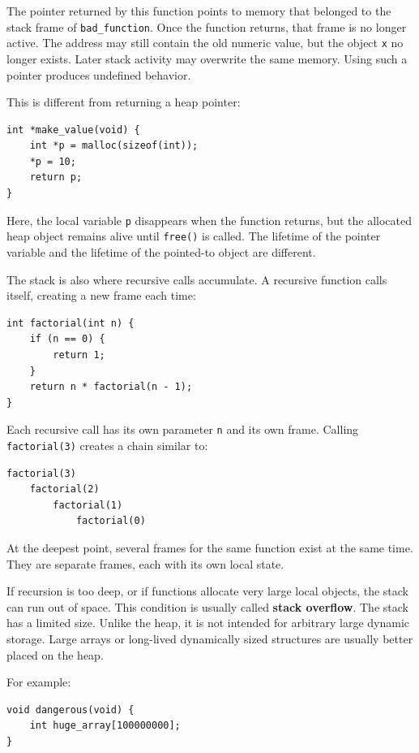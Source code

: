 The pointer returned by this function points to memory that belonged to the stack frame of \texttt{bad\_function}. Once the function returns, that frame is no longer active. The address may still contain the old numeric value, but the object \texttt{x} no longer exists. Later stack activity may overwrite the same memory. Using such a pointer produces undefined behavior.

This is different from returning a heap pointer:

\begin{verbatim}
int *make_value(void) {
    int *p = malloc(sizeof(int));
    *p = 10;
    return p;
}
\end{verbatim}

Here, the local variable \texttt{p} disappears when the function returns, but the allocated heap object remains alive until \texttt{free()} is called. The lifetime of the pointer variable and the lifetime of the pointed-to object are different.

The stack is also where recursive calls accumulate. A recursive function calls itself, creating a new frame each time:

\begin{verbatim}
int factorial(int n) {
    if (n == 0) {
        return 1;
    }
    return n * factorial(n - 1);
}
\end{verbatim}

Each recursive call has its own parameter \texttt{n} and its own frame. Calling \texttt{factorial(3)} creates a chain similar to:

\begin{verbatim}
factorial(3)
    factorial(2)
        factorial(1)
            factorial(0)
\end{verbatim}

At the deepest point, several frames for the same function exist at the same time. They are separate frames, each with its own local state.

If recursion is too deep, or if functions allocate very large local objects, the stack can run out of space. This condition is usually called \textbf{stack overflow}. The stack has a limited size. Unlike the heap, it is not intended for arbitrary large dynamic storage. Large arrays or long-lived dynamically sized structures are usually better placed on the heap.

For example:

\begin{verbatim}
void dangerous(void) {
    int huge_array[100000000];
}
\end{verbatim}

